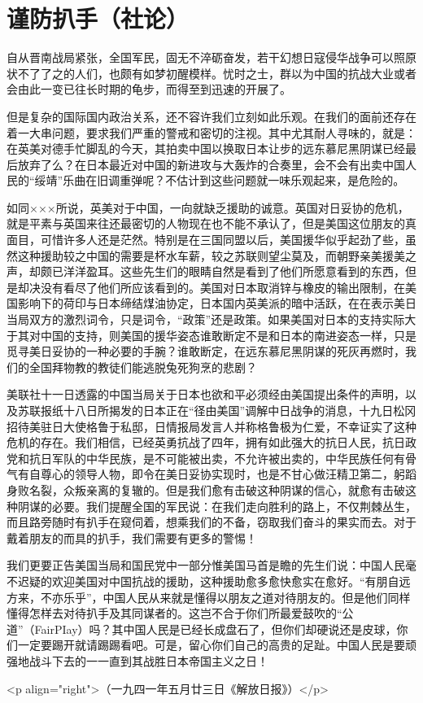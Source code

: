 \section[谨防扒手（社论）（一九四一年五月二十三日）]{谨防扒手（社论）}


自从晋南战局紧张，全国军民，固无不淬砺奋发，若干幻想日寇侵华战争可以照原状不了了之的人们，也颇有如梦初醒模样。忧时之士，群以为中国的抗战大业或者会由此一变已往长时期的龟步，而得至到迅速的开展了。

但是复杂的国际国内政治关系，还不容许我们立刻如此乐观。在我们的面前还存在着一大串问题，要求我们严重的警戒和密切的注视。其中尤其耐人寻味的，就是：在英美对德手忙脚乱的今天，其拍卖中国以换取日本让步的远东慕尼黑阴谋已经最后放弃了么？在日本最近对中国的新进攻与大轰炸的合奏里，会不会有出卖中国人民的“绥靖”乐曲在旧调重弹呢？不估计到这些问题就一味乐观起来，是危险的。

如同×××所说，英美对于中国，一向就缺乏援助的诚意。英国对日妥协的危机，就是平素与英国来往还最密切的人物现在也不能不承认了，但是美国这位朋友的真面目，可惜许多人还是茫然。特别是在三国同盟以后，美国援华似乎起劲了些，虽然这种援助较之中国的需要是杯水车薪，较之苏联则望尘莫及，而朝野亲美援美之声，却颇已洋洋盈耳。这些先生们的眼睛自然是看到了他们所愿意看到的东西，但是却决没有看尽了他们所应该看到的。美国对日本取消锌与橡皮的输出限制，在美国影响下的荷印与日本缔结煤油协定，日本国内英美派的暗中活跃，在在表示美日当局双方的激烈词令，只是词令，“政策”还是政策。如果美国对日本的支持实际大于其对中国的支持，则美国的援华姿态谁敢断定不是和日本的南进姿态一样，只是觅寻美日妥协的一种必要的手腕？谁敢断定，在远东慕尼黑阴谋的死灰再燃时，我们的全国拜物教的教徒们能逃脱兔死狗烹的悲剧？

美联社十一日透露的中国当局关于日本也欲和平必须经由美国提出条件的声明，以及苏联报纸十八日所揭发的日本正在“径由美国”调解中日战争的消息，十九日松冈招待美驻日大使格鲁于私邸，日情报局发言人并称格鲁极为仁爱，不幸证实了这种危机的存在。我们相信，已经英勇抗战了四年，拥有如此强大的抗日人民，抗日政党和抗日军队的中华民族，是不可能被出卖，不允许被出卖的，中华民族任何有骨气有自尊心的领导人物，即令在美日妥协实现时，也是不甘心做汪精卫第二，躬蹈身败名裂，众叛亲离的复辙的。但是我们愈有击破这种阴谋的信心，就愈有击破这种阴谋的必要。我们提醒全国的军民说：在我们走向胜利的路上，不仅荆棘丛生，而且路旁随时有扒手在窥伺着，想乘我们的不备，窃取我们奋斗的果实而去。对于戴着朋友的而具的扒手，我们需要有更多的警惕！

我们更要正告美国当局和国民党中一部分惟美国马首是瞻的先生们说：中国人民毫不迟疑的欢迎美国对中国抗战的援助，这种援助愈多愈快愈实在愈好。“有朋自远方来，不亦乐乎”，中国人民从来就是懂得以朋友之道对待朋友的。但是他们同样懂得怎样去对待扒手及其同谋者的。这岂不合于你们所最爱鼓吹的“公道”（FairPIay）吗？其中国人民是已经长成盘石了，但你们却硬说还是皮球，你们一定要踢开就请踢踢看吧。可是，留心你们自己的高贵的足趾。中国人民是要顽强地战斗下去的一一直到其战胜日本帝国主义之日！

<p align="right">（一九四一年五月廿三日《解放日报》）</p>

